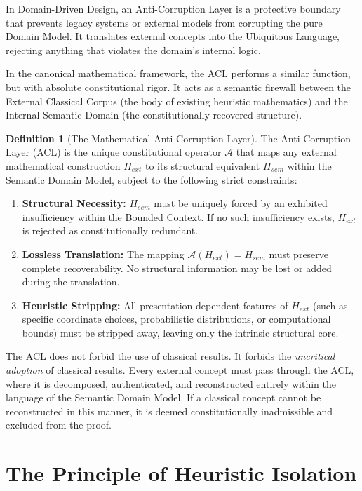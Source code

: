 \documentclass[12pt,openany]{extbook}
\theoremstyle{plain}
\theoremstyle{definition}
\newtheorem{definition}{Definition}[chapter]
\begin{document}
In Domain-Driven Design, an Anti-Corruption Layer is a protective boundary that prevents legacy systems or external models from corrupting the pure Domain Model. It translates external concepts into the Ubiquitous Language, rejecting anything that violates the domain's internal logic.

In the canonical mathematical framework, the ACL performs a similar function, but with absolute constitutional rigor. It acts as a semantic firewall between the External Classical Corpus (the body of existing heuristic mathematics) and the Internal Semantic Domain (the constitutionally recovered structure).

\begin{definition}[The Mathematical Anti-Corruption Layer]
The Anti-Corruption Layer (ACL) is the unique constitutional operator $\mathcal{A}$ that maps any external mathematical construction $H_{ext}$ to its structural equivalent $H_{sem}$ within the Semantic Domain Model, subject to the following strict constraints:
\begin{enumerate}
    \item \textbf{Structural Necessity:} $H_{sem}$ must be uniquely forced by an exhibited insufficiency within the Bounded Context. If no such insufficiency exists, $H_{ext}$ is rejected as constitutionally redundant.
    \item \textbf{Lossless Translation:} The mapping $\mathcal{A}(H_{ext}) = H_{sem}$ must preserve complete recoverability. No structural information may be lost or added during the translation.
    \item \textbf{Heuristic Stripping:} All presentation-dependent features of $H_{ext}$ (such as specific coordinate choices, probabilistic distributions, or computational bounds) must be stripped away, leaving only the intrinsic structural core.
\end{enumerate}
\end{definition}

The ACL does not forbid the use of classical results. It forbids the \emph{uncritical adoption} of classical results. Every external concept must pass through the ACL, where it is decomposed, authenticated, and reconstructed entirely within the language of the Semantic Domain Model. If a classical concept cannot be reconstructed in this manner, it is deemed constitutionally inadmissible and excluded from the proof.

\section{The Principle of Heuristic Isolation}
\end{document}
